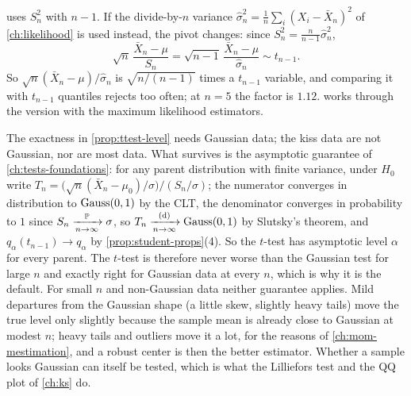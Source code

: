 \begin{pitfall}
 uses $S_n^2$ with $n - 1$.
If the divide-by-$n$ variance $\hat{\sigma}_n^2 = \frac1n\sum_i (X_i - \bar{X}_n)^2$ of \cref{ch:likelihood} is used instead, the pivot changes: since $S_n^2 = \frac{n}{n-1}\hat{\sigma}_n^2$,
\[
\sqrt{n}\,\frac{\bar{X}_n - \mu}{S_n} = \sqrt{n-1}\,\frac{\bar{X}_n - \mu}{\hat{\sigma}_n} \sim t_{n-1}.
\]
So $\sqrt{n}(\bar{X}_n - \mu)/\hat{\sigma}_n$ is $\sqrt{n/(n-1)}$ times a $t_{n-1}$ variable, and comparing it with $t_{n-1}$ quantiles rejects too often; at $n = 5$ the factor is $1.12$.
 works through the version with the maximum likelihood estimators.
\end{pitfall}


\begin{bridge}
The exactness in \cref{prop:ttest-level} needs Gaussian data; the kiss data are not Gaussian, nor are most data.
What survives is the asymptotic guarantee of \cref{ch:tests-foundations}: for any parent distribution with finite variance, under $H_0$ write $T_n = \big(\sqrt{n}(\bar{X}_n - \mu_0)/\sigma\big)\big/(S_n/\sigma)$; the numerator converges in distribution to $\text{Gauss}(0,1)$ by the CLT, the denominator converges in probability to $1$ since $S_n \xrightarrow [n \to \infty ]{\mathbb{P}} \sigma$, so $T_n \xrightarrow [n \to \infty ]{\text{(d)}} \text{Gauss}(0,1)$ by Slutsky's theorem, and $q_\alpha(t_{n-1}) \to q_\alpha$ by \cref{prop:student-props}(4). So the $t$-test has asymptotic level $\alpha$ for every parent.
The $t$-test is therefore never worse than the Gaussian test for large $n$ and exactly right for Gaussian data at every $n$, which is why it is the default.
For small $n$ and non-Gaussian data neither guarantee applies.
Mild departures from the Gaussian shape (a little skew, slightly heavy tails) move the true level only slightly because the sample mean is already close to Gaussian at modest $n$; heavy tails and outliers move it a lot, for the reasons of \cref{ch:mom-mestimation}, and a robust center is then the better estimator.
Whether a sample looks Gaussian can itself be tested, which is what the Lilliefors test and the QQ plot of \cref{ch:ks} do.
\end{bridge}

